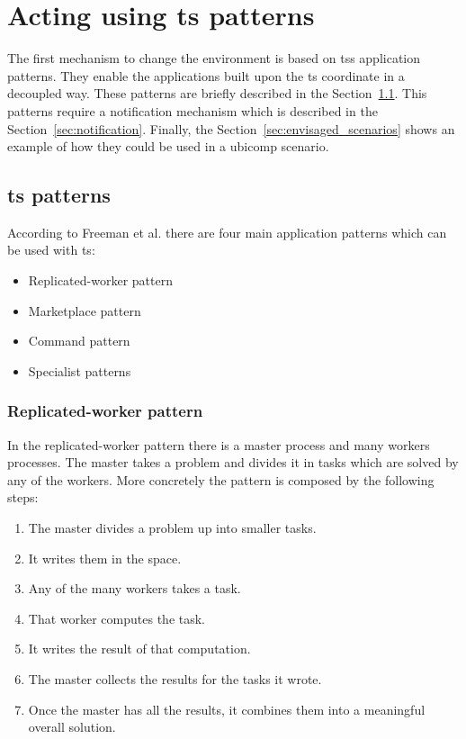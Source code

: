 
\section{Acting using \ac{ts} patterns}

The first mechanism to change the environment is based on \acp{ts} application patterns.
They enable the applications built upon the \ac{ts} coordinate in a decoupled way.
These patterns are briefly described in the Section~\ref{sec:ts_patterns}.
This patterns require a notification mechanism which is described in the Section~\ref{sec:notification}.
Finally, the Section~\ref{sec:envisaged_scenarios} shows an example of how they could be used in a \ac{ubicomp} scenario.


\subsection{\ac{ts} patterns}
\label{sec:ts_patterns}

According to Freeman et al. \cite{freeman_javaspaces_1999} there are four main application patterns which can be used with \ac{ts}:
\begin{itemize}
 \item Replicated-worker pattern
 \item Marketplace pattern
 \item Command pattern
 \item Specialist patterns
\end{itemize}


\subsubsection{Replicated-worker pattern}

In the replicated-worker pattern there is a master process and many workers processes.
The master takes a problem and divides it in tasks which are solved by any of the workers.
More concretely the pattern is composed by the following steps:

\begin{enumerate}
  \item The master divides a problem up into smaller tasks.
  \item It writes them in the space.
  \item Any of the many workers takes a task.
  \item That worker computes the task.
  \item It writes the result of that computation.
  \item The master collects the results for the tasks it wrote.
  \item Once the master has all the results, it combines them into a meaningful overall solution.
\end{enumerate}

